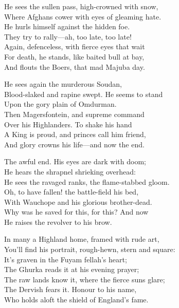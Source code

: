 \begin{poemblock}
He sees the sullen pass, high-crowned with snow,\\
\hspace*{3em}Where Afghans cower with eyes of gleaming hate.\\
He hurls himself against the hidden foe.\\
\hspace*{3em}They try to rally—ah, too late, too late!\\
\hspace*{3em}Again, defenceless, with fierce eyes that wait\\
For death, he stands, like baited bull at bay,\\
And flouts the Boers, that mad Majuba day.

He sees again the murderous Soudan,\\
\hspace*{3em}Blood-slaked and rapine swept. He seems to stand\\
Upon the gory plain of Omdurman.\\
\hspace*{3em}Then Magersfontein, and supreme command\\
\hspace*{3em}Over his Highlanders. To shake his hand\\
A King is proud, and princes call him friend,\\
And glory crowns his life—and now the end.

The awful end. His eyes are dark with doom;\\
\hspace*{3em}He hears the shrapnel shrieking overhead:\\
He sees the ravaged ranks, the flame-stabbed gloom.\\
\hspace*{3em}Oh, to have fallen! the battle-field his bed,\\
\hspace*{3em}With Wauchope and his glorious brother-dead.\\
Why was he saved for this, for this? And now\\
He raises the revolver to his brow.

In many a Highland home, framed with rude art,\\
\hspace*{3em}You'll find his portrait, rough-hewn, stern and square:\\
It's graven in the Fuyam fellah's heart;\\
\hspace*{3em}The Ghurka reads it at his evening prayer;\\
\hspace*{3em}The raw lands know it, where the fierce suns glare;\\
The Dervish fears it. Honour to his name,\\
Who holds aloft the shield of England's fame.


\end{poemblock}
